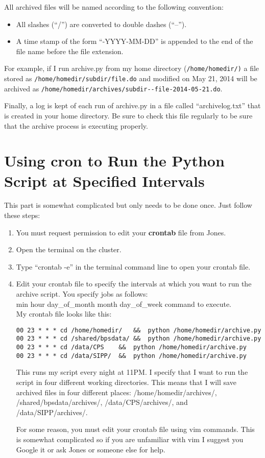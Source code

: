 \documentclass[11pt]{article}
\begin{document}
All archived files will be named according to the following convention:
\begin{itemize}
  \item All slashes (``/'') are converted to double dashes (``--'').
  \item A time stamp of the form ``-YYYY-MM-DD'' is appended to the end of the file name before the file extension.
\end{itemize}

For example, if I run archive.py from my home directory (\nolinkurl{/home/homedir/)} a file stored as \nolinkurl{/home/homedir/subdir/file.do} and modified on May 21, 2014 will be archived as \nolinkurl{/home/homedir/archives/subdir--file-2014-05-21.do}.

Finally, a log is kept of each run of archive.py in a file called ``archivelog.txt'' that is created in your home directory. Be sure to check this file regularly to be sure that the archive process is executing properly.

\section{Using \textbf{cron} to Run the Python Script at Specified Intervals}

This part is somewhat complicated but only needs to be done once. Just follow these steps:
\begin{enumerate}
  \item You must request permission to edit your \textbf{crontab} file from Jones.
  \item Open the terminal on the cluster.
  \item Type ``crontab -e'' in the terminal command line to open your crontab file.
  \item Edit your crontab file to specify the intervals at which you want to run the archive script. You specify jobs as follows: \\
    min hour day\_of\_month month day\_of\_week command to execute. \\
    My crontab file looks like this:
    \begin{lstlisting}
00 23 * * * cd /home/homedir/	&&	python /home/homedir/archive.py
00 23 * * * cd /shared/bpsdata/	&&	python /home/homedir/archive.py
00 23 * * * cd /data/CPS	&&	python /home/homedir/archive.py
00 23 * * * cd /data/SIPP/	&&	python /home/homedir/archive.py
    \end{lstlisting}
    This runs my script every night at 11PM. I specify that I want to run the script in four different working directories. This means that I will save archived files in four different places: /home/homedir/archives/, /shared/bpsdata/archives/, /data/CPS/archives/, and /data/SIPP/archives/.

    For some reason, you must edit your crontab file using vim commands. This is somewhat complicated so if you are unfamiliar with vim I suggest you Google it or ask Jones or someone else for help.
\end{enumerate}
\end{document}
